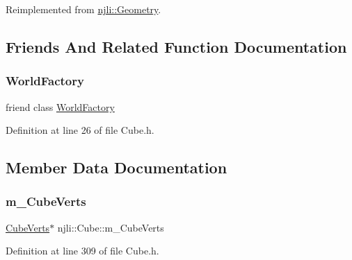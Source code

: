 Reimplemented from \mbox{\hyperlink{classnjli_1_1_geometry_a0c5960113b3cd040e7df7b8d2104f7a3}{njli\+::\+Geometry}}.



\subsection{Friends And Related Function Documentation}
\mbox{\label{classnjli_1_1_cube_acb96ebb09abe8f2a37a915a842babfac}} 
\subsubsection{\texorpdfstring{World\+Factory}{WorldFactory}}
{\footnotesize\ttfamily friend class \mbox{\hyperlink{classnjli_1_1_world_factory}{World\+Factory}}\hspace{0.3cm}{\ttfamily [friend]}}



Definition at line 26 of file Cube.\+h.



\subsection{Member Data Documentation}
\mbox{\label{classnjli_1_1_cube_aef7ffe6a03c42b84dea87cda97e625f4}} 
\subsubsection{\texorpdfstring{m\+\_\+\+Cube\+Verts}{m\_CubeVerts}}
{\footnotesize\ttfamily \mbox{\hyperlink{structnjli_1_1_cube_1_1_cube_verts}{Cube\+Verts}}$\ast$ njli\+::\+Cube\+::m\+\_\+\+Cube\+Verts\hspace{0.3cm}{\ttfamily [private]}}



Definition at line 309 of file Cube.\+h.

\mbox{\label{classnjli_1_1_cube_a6570ae7288027e012bb99028132debd2}} 
